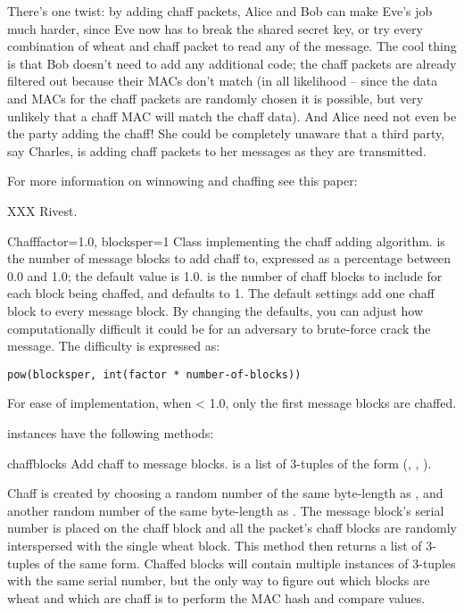 \documentclass{howto}
\begin{document}
There's one twist: by adding chaff packets, Alice and Bob can make Eve's job
much harder, since Eve now has to break the shared secret key, or try every
combination of wheat and chaff packet to read any of the message.  The cool
thing is that Bob doesn't need to add any additional code; the chaff packets
are already filtered out because their MACs don't match (in all likelihood --
since the data and MACs for the chaff packets are randomly chosen it is
possible, but very unlikely that a chaff MAC will match the chaff data).  And
Alice need not even be the party adding the chaff!  She could be completely
unaware that a third party, say Charles, is adding chaff packets to her
messages as they are transmitted.

For more information on winnowing and chaffing see this paper:

XXX Rivest.

\begin{classdesc}{Chaff}{factor=1.0, blocksper=1}
Class implementing the chaff adding algorithm. 
 is the number of message blocks 
            to add chaff to, expressed as a percentage between 0.0 and 1.0; the default value is 1.0.
 is the number of chaff blocks to include for each block
            being chaffed, and defaults to 1.  The default settings 
add one chaff block to every
            message block.  By changing the defaults, you can adjust how
            computationally difficult it could be for an adversary to
            brute-force crack the message.  The difficulty is expressed as:

\begin{verbatim}
pow(blocksper, int(factor * number-of-blocks))
\end{verbatim}

For ease of implementation, when  < 1.0, only the first
 message blocks are chaffed.
\end{classdesc}

 instances have the following methods:

\begin{methoddesc}{chaff}{blocks}
Add chaff to message blocks.   is a list of 3-tuples of the
form (, , ).

Chaff is created by choosing a random number of the same
byte-length as , and another random number of the same
byte-length as .  The message block's serial number is placed
on the chaff block and all the packet's chaff blocks are randomly
interspersed with the single wheat block.  This method then
returns a list of 3-tuples of the same form.  Chaffed blocks will
contain multiple instances of 3-tuples with the same serial
number, but the only way to figure out which blocks are wheat and
which are chaff is to perform the MAC hash and compare values.
\end{methoddesc}
\end{document}

